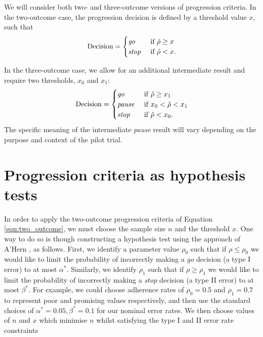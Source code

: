 \documentclass[referee, lineno, pdflatex,sn-vancouver,Numbered]{sn-jnl}%
\theoremstyle{thmstyleone}%
\theoremstyle{thmstyletwo}%
\theoremstyle{thmstylethree}%
\begin{document}
We will consider both two- and three-outcome versions of progression criteria. In the two-outcome case, the progression decision is defined by a threshold value $x$, such that
\begin{equation}\label{eqn:two_outcome}
\text{Decision} = 
\begin{cases}
\text{\emph{go}} & \text{ if } \hat{\rho} \geq x \\
\text{\emph{stop}} & \text{ if } \hat{\rho} < x. \\
\end{cases}
\end{equation}

In the three-outcome case, we allow for an additional intermediate result and require two thresholds, $x_0$ and $x_1$:
\begin{equation}\label{eqn:three_outcome}
\text{Decision} = 
\begin{cases}
\text{\emph{go}} & \text{ if } \hat{\rho} \geq x_1 \\
\text{\emph{pause}} & \text{ if } x_0 < \hat{\rho} < x_1 \\
\text{\emph{stop}} & \text{ if } \hat{\rho} < x_0. \\
\end{cases}
\end{equation}
The specific meaning of the intermediate \emph{pause} result will vary depending on the purpose and context of the pilot trial. 

\section{Progression criteria as hypothesis tests}\label{sec:tests}

In order to apply the two-outcome progression criteria of Equation \ref{eqn:two_outcome}, we must choose the sample size $n$ and the threshold $x$. One way to do so is though constructing a hypothesis test using the approach of A'Hern \cite{AHern2001}, as follows. First, we identify a parameter value $\rho_0$ such that if $\rho \leq \rho_0$ we would like to limit the probability of incorrectly making a \emph{go} decision (a type I error) to at most $\alpha^*$. Similarly, we identify $\rho_1$ such that if $\rho \geq \rho_1$ we would like to limit the probability of incorrectly making a \emph{stop} decision (a type II error) to at most $\beta^*$. For example, we could choose adherence rates of $\rho_0 = 0.5$ and $\rho_1 = 0.7$ to represent poor and promising values respectively, and then use the standard choices of $\alpha^* = 0.05, \beta^* = 0.1$ for our nominal error rates. We then choose values of $n$ and $x$ which minimise $n$ whilst satisfying the type I and II error rate constraints
\end{document}
